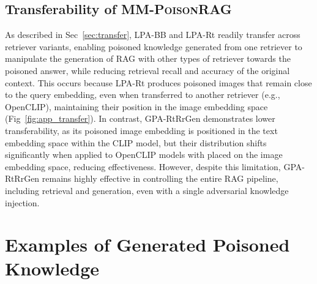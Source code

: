 \subsection{Transferability of \textsc{MM-PoisonRAG}}
\label{sec:transfer_appendix}

As described in Sec~\ref{sec:transfer}, LPA-BB and LPA-Rt readily transfer across retriever variants, enabling poisoned knowledge generated from one retriever to manipulate the generation of RAG with other types of retriever towards the poisoned answer, while reducing retrieval recall and accuracy of the original context. This occurs because LPA-Rt produces poisoned images that remain close to the query embedding, even when transferred to another retriever (e.g., OpenCLIP), maintaining their position in the image embedding space (Fig~\ref{fig:app_transfer}). In contrast, GPA-RtRrGen demonstrates lower transferability, as its poisoned image embedding is positioned in the text embedding space within the CLIP model, but their distribution shifts significantly when applied to OpenCLIP models with placed on the image embedding space, reducing effectiveness. However, despite this limitation, GPA-RtRrGen remains highly effective in controlling the entire RAG pipeline, including retrieval and generation, even with a single adversarial knowledge injection.

\section{Examples of Generated Poisoned Knowledge}
\label{appendix:examples}










